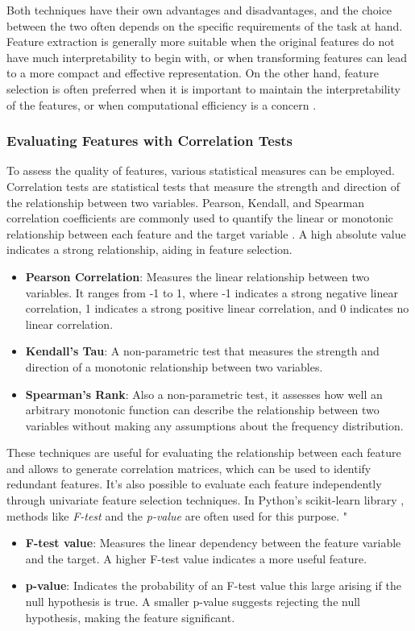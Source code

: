     Both techniques have their own advantages and disadvantages, and the choice between the two often depends on the specific requirements of the task at hand. Feature extraction is generally more suitable when the original features do not have much interpretability to begin with, or when transforming features can lead to a more compact and effective representation. On the other hand, feature selection is often preferred when it is important to maintain the interpretability of the features, or when computational efficiency is a concern \cite{FeatureEngineeringMadeEasy18}.

    \subsubsection{Evaluating Features with Correlation Tests}
    To assess the quality of features, various statistical measures can be employed. Correlation tests are statistical tests that measure the strength and direction of the relationship between two variables. Pearson, Kendall, and Spearman correlation coefficients are commonly used to quantify the linear or monotonic relationship between each feature and the target variable \cite{StatisticalMethodsInPractice09}. A high absolute value indicates a strong relationship, aiding in feature selection.

    \begin{itemize}
        \item \textbf{Pearson Correlation}: Measures the linear relationship between two variables. It ranges from -1 to 1, where -1 indicates a strong negative linear correlation, 1 indicates a strong positive linear correlation, and 0 indicates no linear correlation.
        \item \textbf{Kendall's Tau}: A non-parametric test that measures the strength and direction of a monotonic relationship between two variables.
        \item \textbf{Spearman's Rank}: Also a non-parametric test, it assesses how well an arbitrary monotonic function can describe the relationship between two variables without making any assumptions about the frequency distribution.
    \end{itemize}

    These techniques are useful for evaluating the relationship between each feature and allows to generate correlation matrices, which can be used to identify redundant features. It's also possible to evaluate each feature independently through univariate feature selection techniques. In Python's scikit-learn library \cite{ScikitLearn}, methods like \textit{F-test} and the \textit{p-value} are often used for this purpose.
"
    \begin{itemize}
        \item \textbf{F-test value}: Measures the linear dependency between the feature variable and the target. A higher F-test value indicates a more useful feature.
        \item \textbf{p-value}: Indicates the probability of an F-test value this large arising if the null hypothesis is true. A smaller p-value suggests rejecting the null hypothesis, making the feature significant.
    \end{itemize}

